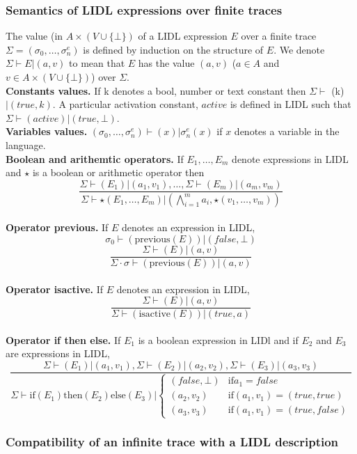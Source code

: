 \subsubsection{Semantics of LIDL expressions over finite traces}
The value (in $A \times (V \cup \{\bot\})$ of a LIDL expression $E$
over a finite trace $\Sigma = (\sigma_0,\ldots,\sigma_n^e)$ is defined
by induction on the structure of $E$. We denote $\Sigma \vdash E |
(a,v)$ to mean that $E$ has the value $(a,v)$ ($a \in A$ and $v \in  A
\times (V \cup \{\bot\})$) over $\Sigma$. \\
\noindent
\textbf{Constants values.} If k denotes a bool, number or text constant
then $\Sigma \vdash$ (\mbox{k})$ | (true,k)$. A particular activation
constant, $active$ is defined in LIDL such that $\Sigma \vdash (active) | (true, \bot)$.\\
\noindent
\textbf{Variables values.} $(\sigma_0,\ldots,\sigma_n^e) \vdash (x) |
\sigma_n^e(x)$ if $x$ denotes a variable in the language.\\
\noindent
\textbf{Boolean and arithemtic operators.} If $E_1,\ldots,E_m$ denote
expressions in LIDL and $\star$ is a boolean or arithmetic operator
then $$\frac{\Sigma \vdash (E_1) | (a_1,v_1),\ldots,\Sigma \vdash (E_m) |
  (a_m,v_m)}{\Sigma \vdash \star(E_1,\ldots,E_m) |
  (\bigwedge_{i=1}^{m}a_i, \star(v_1,\ldots,v_m))}$$\\
\noindent
\textbf{Operator previous.} If $E$ denotes an expression in LIDL,
$$\sigma_0 \vdash (\mbox{previous}(E)) | (false,\bot)$$
$$\frac{\Sigma
  \vdash (E) | (a,v)}{\Sigma \cdot \sigma \vdash (\mbox{previous}(E)) | (a,v)}$$\\
\noindent
\textbf{Operator isactive.} If $E$ denotes an expression in LIDL,
$$\frac{\Sigma \vdash (E) | (a,v)}{\Sigma \vdash (\mbox{isactive}(E)) | (true, a)}$$\\
\noindent
\textbf{Operator if then else.} If $E_1$ is a boolean expression in
LIDl and if $E_2$ and $E_3$ are expressions in LIDL,
$$\frac{\Sigma \vdash (E_1)|(a_1,v_1),\Sigma \vdash (E_2)|(a_2,v_2),
  \Sigma \vdash (E_3)|(a_3,v_3)}{\Sigma \vdash \mbox{if} (E_1)
  \mbox{then} (E_2) \mbox{else} (E_3) | 
   \left\{
     \begin{array}{ll}
       (false, \bot) & \mbox{if} a_1 = false \\
       (a_2,v_2) & \mbox{if} (a_1,v_1) = (true,true)\\
       (a_3,v_3) & \mbox{if} (a_1,v_1) = (true,false)
     \end{array}
     \right.
}
$$
\subsubsection{Compatibility  of   an  infinite  trace  with   a  LIDL
description} 

